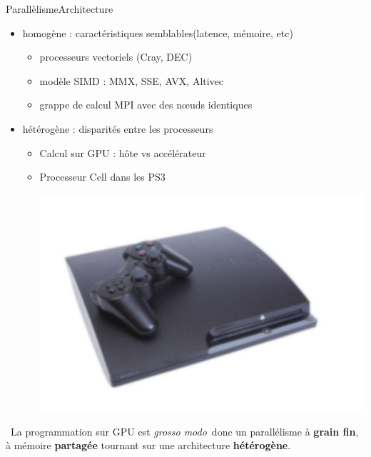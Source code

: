 \documentclass[11pt,mathserif]{beamer}
\newcommand{\hand}{\faHandORight}
\begin{document}
\begin{frame}{Parallèlisme}{Architecture}
\begin{itemize}[<+->]
  \item homogène : caractéristiques semblables(latence, mémoire, etc)
   \begin{itemize}
     \item processeurs vectoriels (Cray, DEC)
     \item modèle SIMD : MMX, SSE, AVX, Altivec
     \item grappe de calcul MPI avec des nœuds identiques
   \end{itemize}
  \item hétérogène : disparités entre les processeurs
   \begin{itemize}
     \item Calcul sur GPU : hôte vs accélérateur
     \item \begin{minipage}[r]{0.49\linewidth} 
         Processeur Cell dans les PS3 
      \end{minipage}
      \begin{minipage}[r]{0.49\linewidth}
        \includegraphics[width=0.6\linewidth]{fig/ps3_lauso.jpg}
      \end{minipage}
\end{itemize}
\end{itemize}
\pause
  \hand\  La programmation sur GPU est {\it grosso modo}\  donc un parallélisme à {\bf grain fin}, à mémoire {\bf partagée} tournant sur
  une architecture {\bf hétérogène}.
\end{frame}
\end{document}
